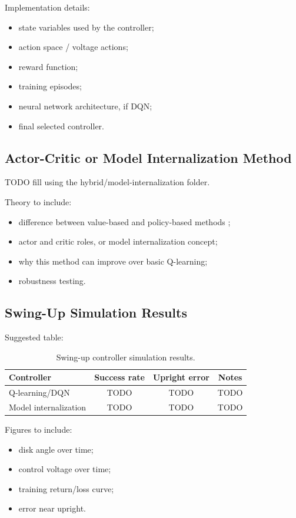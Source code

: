 \documentclass[conference]{IEEEtran}
\begin{document}
Implementation details:
\begin{itemize}
    \item state variables used by the controller;
    \item action space / voltage actions;
    \item reward function;
    \item training episodes;
    \item neural network architecture, if DQN;
    \item final selected controller.
\end{itemize}

\subsection{Actor-Critic or Model Internalization Method}
TODO fill using the hybrid/model-internalization folder.

Theory to include:
\begin{itemize}
    \item difference between value-based and policy-based methods \cite{sutton1999policy};
    \item actor and critic roles, or model internalization concept;
    \item why this method can improve over basic Q-learning;
    \item robustness testing.
\end{itemize}

\subsection{Swing-Up Simulation Results}
Suggested table:
\begin{table}[h]
\centering
\caption{Swing-up controller simulation results.}
\begin{tabular}{lccc}
\toprule
Controller & Success rate & Upright error & Notes \\
\midrule
Q-learning/DQN & TODO & TODO & TODO \\
Model internalization & TODO & TODO & TODO \\
\bottomrule
\end{tabular}
\end{table}

Figures to include:
\begin{itemize}
    \item disk angle over time;
    \item control voltage over time;
    \item training return/loss curve;
    \item error near upright.
\end{itemize}
\end{document}
